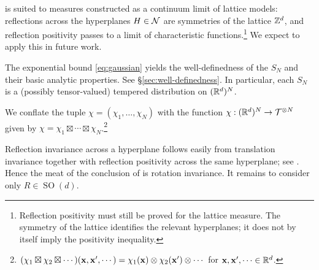  is suited to measures constructed as a continuum limit of lattice models: reflections across the hyperplanes $H\in\mathcal{N}$ are symmetries of the lattice $\mathbb{Z}^d$, and reflection positivity passes to a limit of characteristic functions.\footnote{Reflection positivity must still be proved for the lattice measure. The symmetry of the lattice identifies the relevant hyperplanes; it does not by itself imply the positivity inequality.} We expect to apply this in future work.


\begin{remark*}
    The exponential bound \cref{eq:gaussian} yields the well-definedness of the $S_N$ and their basic analytic properties. See \S\ref{sec:well-definedness}. In particular, each $S_N$ is a (possibly tensor-valued) tempered distribution on $(\mathbb{R}^d)^N$. 
    
    We conflate the tuple $\chi=(\chi_1,\dots,\chi_N)$ with the function $\chi:(\mathbb{R}^d)^N\to \mathcal{T}^{\otimes N}$ given by $\chi=\chi_1\boxtimes \cdots \boxtimes \chi_N$.\footnote{$(\chi_1\boxtimes \chi_2\boxtimes \cdots )(\mathbf{x},\mathbf{x}',\cdots)=\chi_1(\mathbf{x})\otimes\chi_2(\mathbf{x}')\otimes\cdots$ for $\mathbf{x},\mathbf{x}',\cdots \in \mathbb{R}^d$.} 
\end{remark*}
\begin{remark*}
    Reflection invariance across a hyperplane follows easily from translation invariance together with reflection positivity across the same hyperplane; see . Hence the meat of the conclusion of  is rotation invariance.
    It remains to consider only $R\in \operatorname{SO}(d)$.
\end{remark*}

